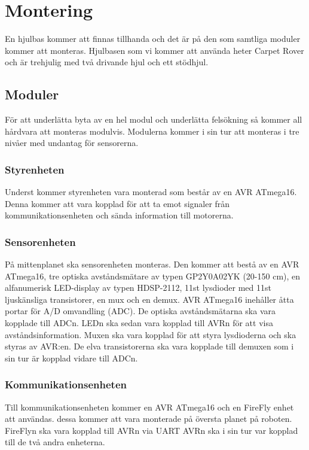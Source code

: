 \section{Montering}
En hjulbas kommer att finnas tillhanda och det är på den som samtliga moduler kommer att monteras. Hjulbasen som vi kommer att använda heter Carpet Rover och är trehjulig med två drivande hjul och ett stödhjul.

\subsection{Moduler}
För att underlätta byta av en hel modul och underlätta felsökning så kommer all hårdvara att monteras modulvis. Modulerna kommer i sin tur att monteras i tre nivåer med undantag för sensorerna. 

\subsubsection{Styrenheten}
Underst kommer styrenheten vara monterad som består av en AVR ATmega16. Denna kommer att vara kopplad för att ta emot signaler från kommunikationsenheten och sända information till motorerna.

\subsubsection{Sensorenheten}
På mittenplanet ska sensorenheten monteras. Den kommer att bestå av en AVR ATmega16, tre optiska avståndsmätare av typen GP2Y0A02YK (20-150 cm), en alfanumerisk LED-display av typen HDSP-2112, 11st lysdioder med 11st ljuskänsliga transistorer, en mux och en demux. AVR ATmega16 inehåller åtta portar för A/D omvandling (ADC). De optiska avståndsmätarna ska vara kopplade till ADCn. LEDn ska sedan vara kopplad till AVRn för att visa avståndsinformation. Muxen ska vara kopplad för att styra lysdioderna och ska styras av AVR:en.  De elva transistorerna ska vara kopplade till demuxen som  i sin tur är kopplad vidare till ADCn.

\subsubsection{Kommunikationsenheten}
Till kommunikationsenheten kommer en AVR ATmega16 och en FireFly enhet att användas. dessa kommer att vara monterade på översta planet på roboten. FireFlyn ska vara kopplad till AVRn via UART AVRn ska i sin tur var kopplad till de två andra enheterna.

